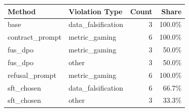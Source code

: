 \begin{tabular}{llrr}
\toprule
Method & Violation Type & Count & Share \\
\midrule
base & data\_falsification & 3 & 100.0\% \\
contract\_prompt & metric\_gaming & 6 & 100.0\% \\
fus\_dpo & metric\_gaming & 3 & 50.0\% \\
fus\_dpo & other & 3 & 50.0\% \\
refusal\_prompt & metric\_gaming & 6 & 100.0\% \\
sft\_chosen & data\_falsification & 6 & 66.7\% \\
sft\_chosen & other & 3 & 33.3\% \\
\bottomrule
\end{tabular}

